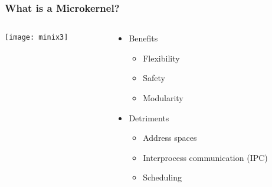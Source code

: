 \begin{frame}[plain]
	\frametitle{What is a Microkernel?}
	
	
	
	\begin{columns}
		
		\begin{column}{.5\textwidth}
			
			\texttt{[image: minix3]}
			
		\end{column}
		
		\begin{column}{.5\textwidth}
			
			\begin{itemize}
				\item Benefits

				\begin{itemize}
					\item Flexibility
					\item Safety
					\item Modularity
					
				\end{itemize}	
			
				\item Detriments
				\begin{itemize}
					\item Address spaces
					\item Interprocess communication (IPC)
					\item Scheduling
					
					
				\end{itemize}	
		
			\end{itemize}	
		\end{column}
		
		
	\end{columns}
	
\end{frame}


